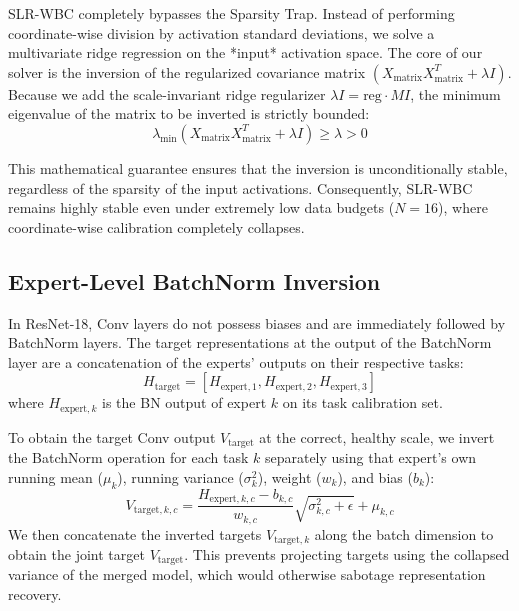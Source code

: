 \documentclass{article}
\theoremstyle{plain}
\theoremstyle{definition}
\theoremstyle{remark}
\begin{document}
SLR-WBC completely bypasses the Sparsity Trap. Instead of performing coordinate-wise division by activation standard deviations, we solve a multivariate ridge regression on the *input* activation space. The core of our solver is the inversion of the regularized covariance matrix $(X_{\text{matrix}} X_{\text{matrix}}^T + \lambda I)$. Because we add the scale-invariant ridge regularizer $\lambda I = \text{reg} \cdot M I$, the minimum eigenvalue of the matrix to be inverted is strictly bounded:
\begin{equation}
  \lambda_{\min}(X_{\text{matrix}} X_{\text{matrix}}^T + \lambda I) \ge \lambda > 0
\end{equation}

This mathematical guarantee ensures that the inversion is unconditionally stable, regardless of the sparsity of the input activations. Consequently, SLR-WBC remains highly stable even under extremely low data budgets ($N=16$), where coordinate-wise calibration completely collapses.

\subsection{Expert-Level BatchNorm Inversion}
\label{subsec:invert_bn}
In ResNet-18, Conv layers do not possess biases and are immediately followed by BatchNorm layers. The target representations at the output of the BatchNorm layer are a concatenation of the experts' outputs on their respective tasks:
\begin{equation}
  H_{\text{target}} = [H_{\text{expert}, 1}, H_{\text{expert}, 2}, H_{\text{expert}, 3}]
\end{equation}
where $H_{\text{expert}, k}$ is the BN output of expert $k$ on its task calibration set.

To obtain the target Conv output $V_{\text{target}}$ at the correct, healthy scale, we invert the BatchNorm operation for each task $k$ separately using that expert's own running mean ($\mu_k$), running variance ($\sigma_k^2$), weight ($w_k$), and bias ($b_k$):
\begin{equation}
  V_{\text{target}, k, c} = \frac{H_{\text{expert}, k, c} - b_{k, c}}{w_{k, c}} \sqrt{\sigma_{k, c}^2 + \epsilon} + \mu_{k, c}
\end{equation}
We then concatenate the inverted targets $V_{\text{target}, k}$ along the batch dimension to obtain the joint target $V_{\text{target}}$. This prevents projecting targets using the collapsed variance of the merged model, which would otherwise sabotage representation recovery.
\end{document}
